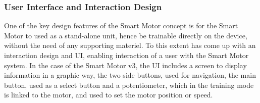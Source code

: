 \subsubsection{\label{sec:methods_sm_ui}User Interface and Interaction Design}

One of the key design features of the Smart Motor concept is for the Smart Motor to used as a stand-alone unit, hence be trainable directly on the device, without the need of any supporting materiel. To this extent \citet[]{dahal_designing_2024} has come up with an interaction design and UI, enabling interaction of a user with the Smart Motor system. In the case of the Smart Motor v3, the UI includes a screen to display information in a graphic way, the two side buttons, used for navigation, the main button, used as a select button and a potentiometer, which in the training mode is linked to the motor, and used to set the motor position or speed.

